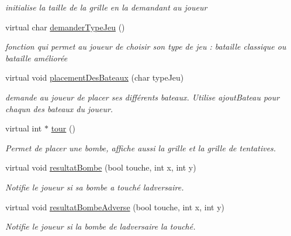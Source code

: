 \begin{DoxyCompactItemize}
\begin{DoxyCompactList}\small\item\em initialise la taille de la grille en la demandant au joueur \end{DoxyCompactList}\item 
virtual char \hyperlink{class_joueur_a72fcb63683baba74922df5de246bff6f}{demander\+Type\+Jeu} ()\hypertarget{class_joueur_a72fcb63683baba74922df5de246bff6f}{}\label{class_joueur_a72fcb63683baba74922df5de246bff6f}

\begin{DoxyCompactList}\small\item\em fonction qui permet au joueur de choisir son type de jeu \+: bataille classique ou bataille améliorée \end{DoxyCompactList}\item 
virtual void \hyperlink{class_joueur_a5f0ab55bcb47e6808e46ef4515ce9565}{placement\+Des\+Bateaux} (char type\+Jeu)
\begin{DoxyCompactList}\small\item\em demande au joueur de placer ses différents bateaux. Utilise ajout\+Bateau pour chaqun des bateaux du joueur. \end{DoxyCompactList}\item 
virtual int $\ast$ \hyperlink{class_joueur_a46bdd92b73a1f0d04aeb5f19f33720b0}{tour} ()
\begin{DoxyCompactList}\small\item\em Permet de placer une bombe, affiche aussi la grille et la grille de tentatives. \end{DoxyCompactList}\item 
virtual void \hyperlink{class_joueur_a661426005c03ad2ee421249758f5c2a7}{resultat\+Bombe} (bool touche, int x, int y)
\begin{DoxyCompactList}\small\item\em Notifie le joueur si sa bombe a touché l\textquotesingle{}adversaire. \end{DoxyCompactList}\item 
virtual void \hyperlink{class_joueur_aeb9de0a7501a5370d45e670e122b3676}{resultat\+Bombe\+Adverse} (bool touche, int x, int y)
\begin{DoxyCompactList}\small\item\em Notifie le joueur si la bombe de l\textquotesingle{}adversaire l\textquotesingle{}a touché. \end{DoxyCompactList}\end{DoxyCompactItemize}
